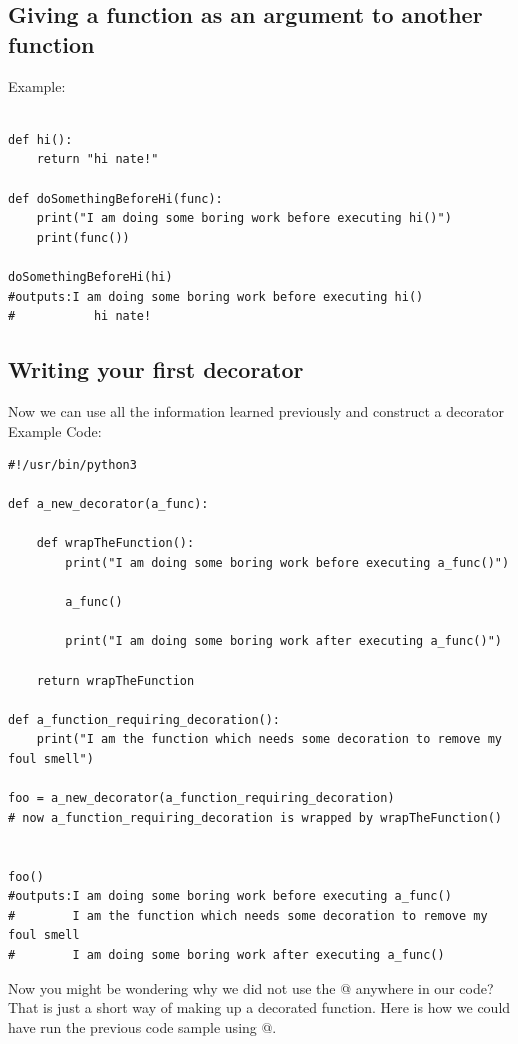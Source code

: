 \documentclass{report}
\begin{document}
    \subsection{Giving a function as an argument to another function}
    \bigbreak \noindent
    Example:
    \begin{verbatim}
    
def hi():
    return "hi nate!"

def doSomethingBeforeHi(func):
    print("I am doing some boring work before executing hi()")
    print(func())

doSomethingBeforeHi(hi)
#outputs:I am doing some boring work before executing hi()
#           hi nate!
    \end{verbatim}



    \subsection{Writing your first decorator}
    \bigbreak \noindent
    Now we can use all the information learned previously and construct a decorator
    \bigbreak \noindent 
    Example Code:
    \begin{verbatim}
#!/usr/bin/python3

def a_new_decorator(a_func):

    def wrapTheFunction():
        print("I am doing some boring work before executing a_func()")

        a_func()

        print("I am doing some boring work after executing a_func()")

    return wrapTheFunction

def a_function_requiring_decoration():
    print("I am the function which needs some decoration to remove my foul smell")

foo = a_new_decorator(a_function_requiring_decoration)
# now a_function_requiring_decoration is wrapped by wrapTheFunction()


foo()
#outputs:I am doing some boring work before executing a_func()
#        I am the function which needs some decoration to remove my foul smell
#        I am doing some boring work after executing a_func()
    \end{verbatim}
    \bigbreak \noindent 
    Now you might be wondering why we did not use the @ anywhere in our code? That is just a short way of making up a decorated function. Here is how we could have run the previous code sample using @.
\end{document}
